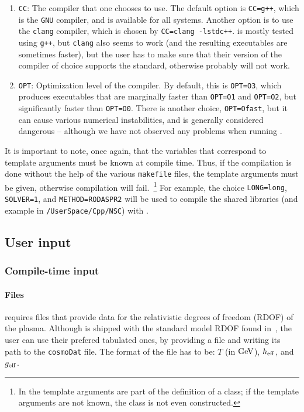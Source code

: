 \documentclass[11pt,a4paper]{article}
\begin{document}
\begin{enumerate}
	\item {\tt CC}: The \CPP compiler that one chooses to use. The default option is {\tt CC=g++}, which is the {\tt GNU} \CPP compiler, and is available for all systems. Another option is to use the {\tt clang} compiler, which is chosen by {\tt CC=clang -lstdc++}. \nsc is mostly tested using {\tt g++}, but {\tt clang} also seems to work (and the resulting executables are sometimes faster), but the user has to make sure that their version of the compiler of choice supports the  standard, otherwise \nsc probably will not work.
	\item {\tt OPT}: Optimization level of the compiler. By default, this is {\tt OPT=O3}, which produces executables that are marginally faster than {\tt OPT=O1} and {\tt OPT=O2}, but significantly faster than {\tt OPT=O0}. There is another choice, {\tt OPT=Ofast}, but it can cause various numerical instabilities, and is generally considered dangerous -- although we have not observed any problems when running \nsc. 
\end{enumerate}
%
It is important to note, once again, that the variables that correspond to template arguments must be known at compile time. Thus, if the compilation is done without the help of the various {\tt makefile} files, the template arguments must be given, otherwise compilation will fail.~\footnote{In \CPP the template arguments are part of the definition of a class; if the template arguments are not known, the class is not even constructed.} For example, the choice {\tt LONG=long}, {\tt SOLVER=1}, and {\tt METHOD=RODASPR2} will be used to compile the shared libraries (and \CPP example in {\tt \nsc/UserSpace/Cpp/NSC}) with . 


\subsection{User input}\label{sec:input}
%
\subsubsection{Compile-time input}\label{sec:compile_time_input} 
%
\paragraph{Files} \nsc requires files that provide data for the relativistic degrees of freedom (RDOF) of the plasma. Although \nsc is shipped with the standard model RDOF found in~\cite{Saikawa:2020swg}, the user can use their prefered tabulated ones, by providing a file and writing its path to the {\tt cosmoDat} file. The format of the file has to be: $T$ (in ${\rm GeV}$), $h_{\rm eff}{}$, and $g_{\rm eff}{}$.
\end{document}
